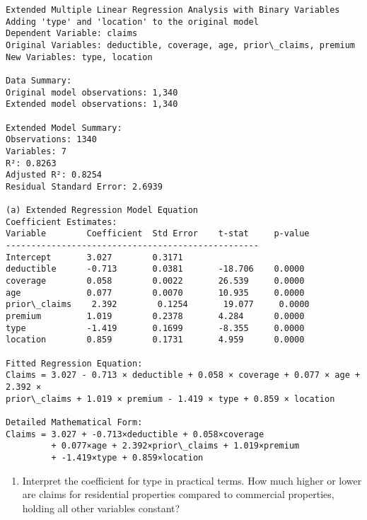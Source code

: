 \documentclass[8pt, twocolumn]{extarticle}
\providecommand{\tightlist}{%
      \setlength{\itemsep}{0pt}\setlength{\parskip}{0pt}}
\begin{document}
    \begin{Verbatim}[commandchars=\\\{\}]
Extended Multiple Linear Regression Analysis with Binary Variables
Adding 'type' and 'location' to the original model
Dependent Variable: claims
Original Variables: deductible, coverage, age, prior\_claims, premium
New Variables: type, location

Data Summary:
Original model observations: 1,340
Extended model observations: 1,340

Extended Model Summary:
Observations: 1340
Variables: 7
R²: 0.8263
Adjusted R²: 0.8254
Residual Standard Error: 2.6939

(a) Extended Regression Model Equation
Coefficient Estimates:
Variable        Coefficient  Std Error    t-stat     p-value
--------------------------------------------------
Intercept       3.027        0.3171
deductible      -0.713       0.0381       -18.706    0.0000
coverage        0.058        0.0022       26.539     0.0000
age             0.077        0.0070       10.935     0.0000
prior\_claims    2.392        0.1254       19.077     0.0000
premium         1.019        0.2378       4.284      0.0000
type            -1.419       0.1699       -8.355     0.0000
location        0.859        0.1731       4.959      0.0000

Fitted Regression Equation:
Claims = 3.027 - 0.713 × deductible + 0.058 × coverage + 0.077 × age + 2.392 ×
prior\_claims + 1.019 × premium - 1.419 × type + 0.859 × location

Detailed Mathematical Form:
Claims = 3.027 + -0.713×deductible + 0.058×coverage
         + 0.077×age + 2.392×prior\_claims + 1.019×premium
         + -1.419×type + 0.859×location
    \end{Verbatim}

    \begin{enumerate}
\def\labelenumi{(\alph{enumi})}
\setcounter{enumi}{1}
\tightlist
\item
  Interpret the coefficient for type in practical terms. How much higher
  or lower are claims for residential properties compared to commercial
  properties, holding all other variables constant?
\end{enumerate}
\end{document}
